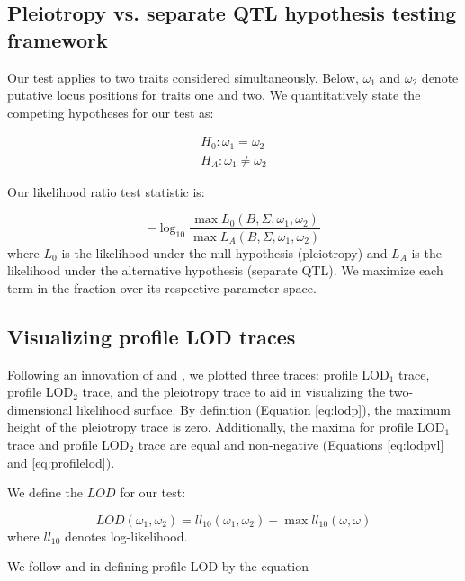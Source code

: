 \documentclass[12pt,twoside, lineno]{gsajnl}
\begin{document}
\subsection{Pleiotropy vs. separate QTL hypothesis testing framework}

Our test applies to two traits considered simultaneously. Below, $\omega_1$ and $\omega_2$ denote putative locus positions for traits one and two. We quantitatively state the competing hypotheses for our test as:

\begin{eqnarray}
H_0: \omega_1 = \omega_2 \nonumber\\
H_A: \omega_1 \neq \omega_2
\label{eqn:hypotheses}
\end{eqnarray}

\noindent Our likelihood ratio test statistic is:

\begin{equation}
- \log_{10} \frac{\max L_0(B, \Sigma, \omega_1, \omega_2)}{\max L_A(B, \Sigma, \omega_1, \omega_2)}
\label{eqn:test-statistic}
\end{equation}
where $L_0$ is the likelihood under the null hypothesis (pleiotropy) and $L_A$ is the likelihood under the alternative hypothesis (separate QTL). We maximize each term in the fraction over its respective parameter space.

\subsection{Visualizing profile LOD traces}

Following an innovation of \citet{zeng2000genetic} and \citet{tian2016dissection}, we plotted three traces: profile LOD$_1$ trace, profile LOD$_2$ trace, and the pleiotropy trace to aid in visualizing the two-dimensional likelihood surface. By definition (Equation \ref{eq:lodp}), the maximum height of the pleiotropy trace is zero. Additionally, the maxima for profile LOD$_1$ trace and profile LOD$_2$ trace are equal and non-negative (Equations \ref{eq:lodpvl} and \ref{eq:profilelod}).

We define the $LOD$ for our test:

\begin{equation}
LOD(\omega_1, \omega_2) = ll_{10}(\omega_1, \omega_2) - \max ll_{10}(\omega, \omega)
\label{eq:lodpvl}
\end{equation}
where $ll_{10}$ denotes log-likelihood.

We follow \citet{zeng2000genetic} and \citet{tian2016dissection} in defining profile LOD by the equation
\end{document}
